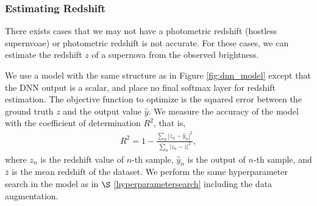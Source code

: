 \documentclass[useamsfonts]{pasj01}
\begin{document}
\subsubsection{Estimating Redshift}

There exists cases that we may not have a photometric redshift (hostless supernvoae)
or photometric redshift is not accurate.
For these cases, we can estimate the redshift $z$ of a supernova from the observed brightness.

We use a model with the same structure as in Figure \ref{fig:dnn_model} except that the DNN output 
is a scalar, and place no final softmax layer for redshift estimation.
The objective function to optimize is the squared error between the ground truth $z$ and the output value $\hat{y}$.
We measure the accuracy of the model with the coefficient of determination $R^2$, that is,
\begin{eqnarray*}
    R^2 = 1 - \frac{\sum_n \left| z_n - \hat{y}_n \right|^2}{\sum_n \left| z_n - \bar{z} \right|^2}, 
\end{eqnarray*}
where $z_n$ is the redshift value of $n$-th sample, $\hat{y}_n$ is the output of $n$-th sample, 
and $\bar{z}$ is the mean redshift of the dataset.
We perform the same hyperparameter search in the model as in $\S$ \ref{hyperparametersearch} 
including the data augmentation.
\end{document}
